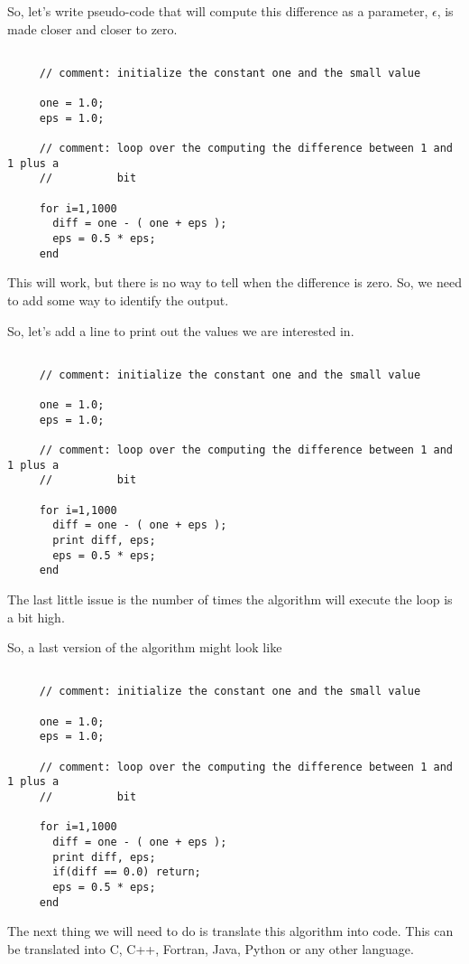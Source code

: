 \documentclass[10pt,fleqn]{article}
\begin{document}
So, let's write pseudo-code that will compute this difference as a parameter,
$\epsilon$, is made closer and closer to zero.
\begin{verbatim}

     // comment: initialize the constant one and the small value

     one = 1.0;
     eps = 1.0;

     // comment: loop over the computing the difference between 1 and 1 plus a
     //          bit

     for i=1,1000
       diff = one - ( one + eps );
       eps = 0.5 * eps;
     end

\end{verbatim}
This will work, but there is no way to tell when the difference is zero. So, we
need to add some way to identify the output.

So, let's add a line to print out the values we are interested in.
\begin{verbatim}

     // comment: initialize the constant one and the small value

     one = 1.0;
     eps = 1.0;

     // comment: loop over the computing the difference between 1 and 1 plus a
     //          bit

     for i=1,1000
       diff = one - ( one + eps );
       print diff, eps;
       eps = 0.5 * eps;
     end

\end{verbatim}
The last little issue is the number of times the algorithm will execute the loop
is a bit high.

So, a last version of the algorithm might look like
\begin{verbatim}

     // comment: initialize the constant one and the small value

     one = 1.0;
     eps = 1.0;

     // comment: loop over the computing the difference between 1 and 1 plus a
     //          bit

     for i=1,1000
       diff = one - ( one + eps );
       print diff, eps;
       if(diff == 0.0) return;
       eps = 0.5 * eps;
     end

\end{verbatim}
The next thing we will need to do is translate this algorithm into code. This
can be translated into C, C++, Fortran, Java, Python or any other language.
\end{document}
